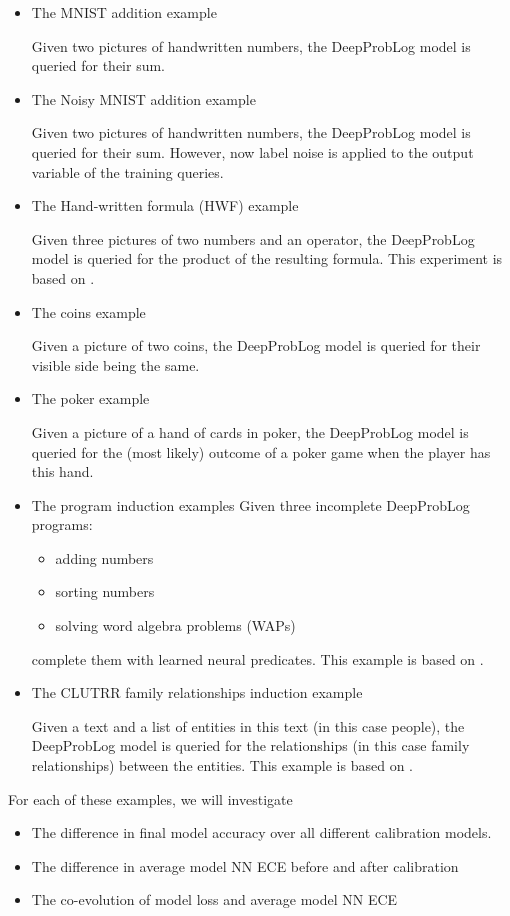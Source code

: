 \begin{itemize}
\item The MNIST addition example\par
Given two pictures of handwritten numbers, the DeepProbLog model is queried for their sum.
\item The Noisy MNIST addition example\par
Given two pictures of handwritten numbers, the DeepProbLog model is queried for their sum. However, now label noise is applied to the output variable of the training queries.
\item The Hand-written formula (HWF) example\par
Given three pictures of two numbers and an operator, the DeepProbLog model is queried for the product of the resulting formula. This experiment is based on \cite{li2020hwf}.
\item The coins example\par
Given a picture of two coins, the DeepProbLog model is queried for their visible side being the same.
\item The poker example\par
Given a picture of a hand of cards in poker, the DeepProbLog model is queried for the (most likely) outcome of a poker game when the player has this hand.
\item The program induction examples
Given three incomplete DeepProbLog programs:
\begin{itemize}
\item adding numbers
\item sorting numbers
\item solving word algebra problems (WAPs)
\end{itemize}
complete them with learned neural predicates. This example is based on \cite{riedel2016forth}.
\item The CLUTRR family relationships induction example\par
Given a text and a list of entities in this text (in this case people), the DeepProbLog model is queried for the relationships (in this case family relationships) between the entities. This example is based on \cite{sinha2019clutrr}.
\end{itemize}
For each of these examples, we will investigate
\begin{itemize}
  \item The difference in final model accuracy over all different calibration models.
  \item The difference in average model NN ECE before and after calibration
  \item The co-evolution of model loss and average model NN ECE
\end{itemize}
